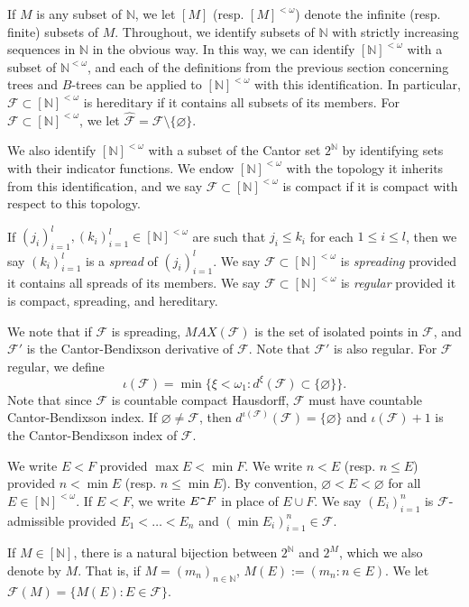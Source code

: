 \documentclass[12pt]{amsart}
\theoremstyle{definition}
\newcommand{\fin}{[\mathbb{N}]^{<\omega}}
\newcommand{\infin}{[\mathbb{N}]}
\newcommand{\nn}{\mathbb{N}}
\newcommand{\fff}{\mathcal{F}}
\begin{document}
If $M$ is any subset of $\nn$, we let $[M]$ (resp. $[M]^{<\omega}$) denote the infinite (resp. finite) subsets of $M$.  Throughout, we identify subsets of $\nn$ with strictly increasing sequences in $\nn$ in the obvious way.  In this way, we can identify $\fin$ with a subset of $\nn^{<\omega}$, and each of the definitions from the previous section concerning trees and $B$-trees can be applied to $\fin$ with this identification.  In particular, $\fff\subset \fin$ is hereditary if it contains all subsets of its members.  For $\fff\subset \fin$, we let $\widehat{\fff}=\fff\setminus \{\varnothing\}$.  

We also identify $\fin$ with a subset of the Cantor set $2^\nn$ by identifying sets with their indicator functions.  We endow $\fin$ with the topology it inherits from this identification, and we say $\fff\subset \fin$ is compact if it is compact with respect to this topology.  

If $(j_i)_{i=1}^l, (k_i)_{i=1}^l\in \fin$ are such that $j_i\leqslant k_i$ for each $1\leqslant i\leqslant l$, then we say $(k_i)_{i=1}^l$ is a \emph{spread} of $(j_i)_{i=1}^l$.  We say $\fff \subset \fin$ is \emph{spreading} provided it contains all spreads of its members.  We say $\fff\subset \fin$ is \emph{regular} provided it is compact, spreading, and hereditary.  

We note that if $\fff$ is spreading, $MAX(\fff)$ is the set of isolated points in $\fff$, and $\fff'$ is the Cantor-Bendixson derivative of $\fff$. Note that $\fff'$ is also regular.   For $\fff$ regular, we define $$\iota(\fff)=\min \{\xi<\omega_1: d^\xi(\fff)\subset \{\varnothing\}\}.$$  Note that since $\fff$ is countable compact Hausdorff, $\fff$ must have countable Cantor-Bendixson index.  If $\varnothing \neq \fff$, then $d^{\iota(\fff)}(\fff)=\{\varnothing\}$ and $\iota(\fff)+1$ is the Cantor-Bendixson index of $\fff$.  

We write $E<F$ provided $\max E<\min F$.  We write $n<E$ (resp. $n\leqslant E$) provided $n<\min E$ (resp. $n\leqslant \min E$).  By convention, $\varnothing <E<\varnothing$ for all $E\in \fin$.   If $E<F$, we write $E\verb!^!F$ in place of $E\cup F$.  We say $(E_i)_{i=1}^n$ is $\fff$-admissible provided $E_1<\ldots <E_n$ and $(\min E_i)_{i=1}^n\in \fff$.  

If $M\in \infin$, there is a natural bijection between $2^\nn$ and $2^M$, which we also denote by $M$.  That is, if $M=(m_n)_{n\in \nn}$, $M(E):=(m_n: n\in E)$.  We let $\fff(M)=\{M(E): E\in \fff\}$.  
\end{document}
